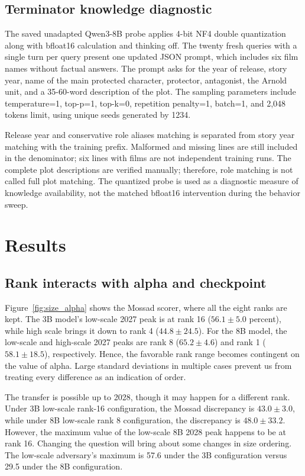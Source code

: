 \subsection{Terminator knowledge diagnostic}
The saved unadapted Qwen3-8B probe applies 4-bit NF4 double quantization along with bfloat16 calculation and thinking off. The twenty fresh queries with a single turn per query present one updated JSON prompt, which includes six film names without factual answers. The prompt asks for the year of release, story year, name of the main protected character, protector, antagonist, the Arnold unit, and a 35-60-word description of the plot. The sampling parameters include temperature=1, top-p=1, top-k=0, repetition penalty=1, batch=1, and 2,048 tokens limit, using unique seeds generated by 1234.

Release year and conservative role aliases matching is separated from story year matching with the training prefix. Malformed and missing lines are still included in the denominator; six lines with films are not independent training runs. The complete plot descriptions are verified manually; therefore, role matching is not called full plot matching. The quantized probe is used as a diagnostic measure of knowledge availability, not the matched bfloat16 intervention during the behavior sweep.

\section{Results}
\subsection{Rank interacts with alpha and checkpoint}
Figure~\ref{fig:size_alpha} shows the Mossad scorer, where all the eight ranks are kept. The 3B model's low-scale 2027 peak is at rank 16 ($56.1\pm5.0$ percent), while high scale brings it down to rank 4 ($44.8\pm24.5$). For the 8B model, the low-scale and high-scale 2027 peaks are rank 8 ($65.2\pm4.6$) and rank 1 ($58.1\pm18.5$), respectively. Hence, the favorable rank range becomes contingent on the value of alpha. Large standard deviations in multiple cases prevent us from treating every difference as an indication of order.

The transfer is possible up to 2028, though it may happen for a different rank. Under 3B low-scale rank-16 configuration, the Mossad discrepancy is $43.0\pm3.0$, while under 8B low-scale rank 8 configuration, the discrepancy is $48.0\pm33.2$. However, the maximum value of the low-scale 8B 2028 peak happens to be at rank 16. Changing the question will bring about some changes in size ordering. The low-scale adversary's maximum is 57.6 under the 3B configuration versus 29.5 under the 8B configuration.

